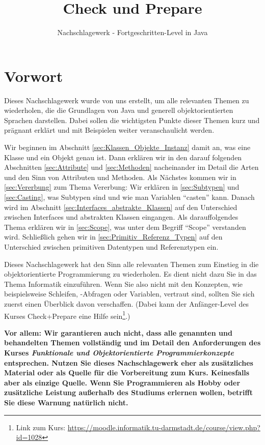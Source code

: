 \documentclass{tuda-pub}
\title{Check und Prepare}
\subtitle{Nachschlagewerk - Fortgeschritten-Level in Java}
\begin{document}
  \maketitle

  \chapter*{Vorwort}
  Dieses Nachschlagewerk wurde von uns erstellt, um alle relevanten Themen zu wiederholen, die
  die Grundlagen von Java und generell objektorientierten Sprachen darstellen. Dabei sollen die
  wichtigsten Punkte dieser Themen kurz und prägnant erklärt und mit Beispielen weiter
  veranschaulicht werden.

  \br

  Wir beginnen im Abschnitt \ref{sec:Klassen_Objekte_Instanz} damit an, was eine Klasse und ein
  Objekt genau ist. Dann erklären wir in den darauf folgenden Abschnitten \ref{sec:Attribute} und
  \ref{sec:Methoden} nacheinander im Detail die Arten und den Sinn von Attributen und Methoden.
  Als Nächstes kommen wir in \ref{sec:Vererbung} zum Thema Vererbung: Wir erklären in
  \ref{sec:Subtypen} und \ref{sec:Casting}, was Subtypen sind und wie man Variablen
  \enquote{casten} kann. Danach wird im Abschnitt \ref{sec:Interfaces_abstrakte_Klassen} auf den
  Unterschied zwischen Interfaces und abstrakten Klassen eingangen. Als darauffolgendes Thema
  erklären wir in \ref{sec:Scope}, was unter dem Begriff \enquote{Scope} verstanden wird.
  Schließlich gehen wir in \ref{sec:Primitiv_Referenz_Typen} auf den Unterschied zwischen
  primitiven Datentypen und Referenztypen ein.

  \begin{note}[title=Achtung:, color=tuda-orange]
    Dieses Nachschlagewerk hat den Sinn alle relevanten Themen zum Einstieg in die
    objektorientierte Programmierung zu wiederholen. Es dient nicht dazu Sie in das Thema
    Informatik einzuführen. Wenn Sie also nicht mit den Konzepten, wie beispielsweise Schleifen,
    -Abfragen oder Variablen, vertraut sind, sollten Sie sich zuerst einen
    Überblick davon verschaffen. (Dabei kann der Anfänger-Level des Kurses Check+Prepare eine
    Hilfe sein\footnote{Link zum Kurs:
    \url{https://moodle.informatik.tu-darmstadt.de/course/view.php?id=1028}}.)

    \br

    \textbf{Vor allem: Wir garantieren auch nicht, dass alle genannten und behandelten Themen
    vollständig und im Detail den Anforderungen des Kurses \emph{Funktionale und
    Objektorientierte Programmierkonzepte} entsprechen. Nutzen Sie dieses Nachschlagewerk eher
    als zusätzliches Material oder als Quelle für die Vorbereitung zum Kurs. Keinesfalls aber als
    einzige Quelle. Wenn Sie Programmieren als Hobby oder zusätzliche Leistung außerhalb des
    Studiums erlernen wollen, betrifft Sie diese Warnung natürlich nicht.}
  \end{note}
\end{document}
